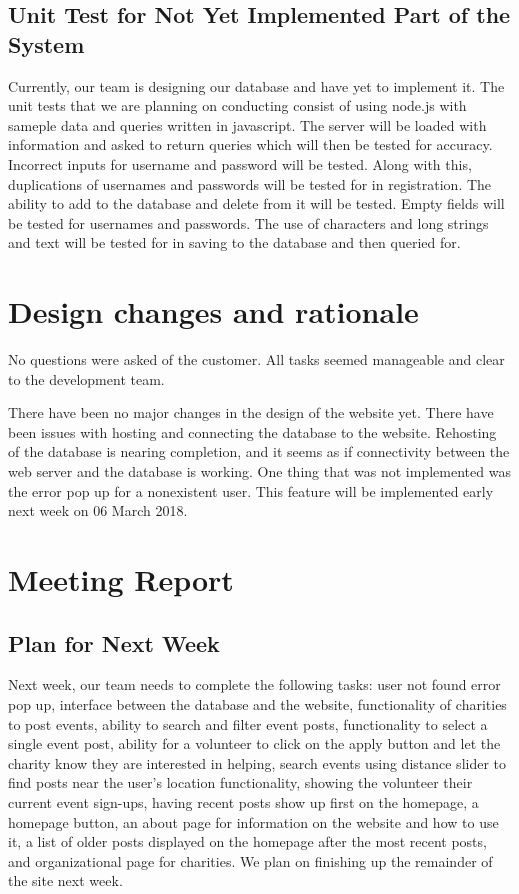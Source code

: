 \documentclass[12pt]{article}
\begin{document}
\subsection{Unit Test for Not Yet Implemented Part of the System}
	Currently, our team is designing our database and have yet to implement it. The
	unit tests that we are planning on conducting consist of using node.js with
	sameple data and queries written in javascript. The server will be loaded with
	information and asked to return queries which will then be tested for
	accuracy. Incorrect inputs for username and password will be tested. Along with
	this, duplications of usernames and passwords will be tested for in
	registration. The ability to add to the database and delete from it will be
	tested. Empty fields will be tested for usernames and passwords. The use
	of characters and long strings and text will be tested for in saving to the
	database and then queried for.
\section{Design changes and rationale}
	No questions were asked of the customer. All tasks seemed manageable and
	clear to the development team.

	There have been no major changes in the design of the website yet. There have
	been issues with hosting and connecting the database to the website. Rehosting
	of the database is nearing completion, and it seems as if connectivity
	between the web server and the database is working. One thing that was not
	implemented was the error pop up for a nonexistent user. This feature will be
	implemented early next week on 06 March 2018.
\section{Meeting Report}
\subsection{Plan for Next Week}
	Next week, our team needs to complete the following tasks: user not found
	error pop up, interface between the database and the website, functionality of
	charities to post events, ability to search and filter event posts,
	functionality to select a single event post, ability for a volunteer to click
	on the apply button and let the charity know they are interested in
	helping, search events using distance slider to find posts near the user's
	location functionality, showing the volunteer their current event sign-ups,
	having recent posts show up first on the homepage, a homepage button, an about
	page for information on the website and how to use it, a list of older posts
	displayed on the homepage after the most recent posts, and organizational page
	for charities. We plan on finishing up the remainder of the site next week.
\end{document}
